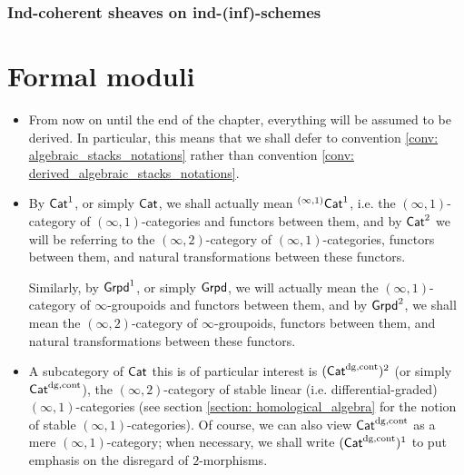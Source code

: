             \subsubsection{Ind-coherent sheaves on ind-(inf)-schemes}
        
    \section{Formal moduli}
        \begin{convention} \label{conv: moduli_everything_is_derived}
            \noindent
            \begin{itemize}
                \item From now on until the end of the chapter, everything will be assumed to be derived. In particular, this means that we shall defer to convention \ref{conv: algebraic_stacks_notations} rather than convention \ref{conv: derived_algebraic_stacks_notations}.
                \item By $\mathsf{Cat}^1$, or simply $\mathsf{Cat}$, we shall actually mean ${}^{(\infty, 1)}\mathsf{Cat}^1$, i.e. the $(\infty, 1)$-category of $(\infty, 1)$-categories and functors between them, and by $\mathsf{Cat}^2$ we will be referring to the $(\infty, 2)$-category of $(\infty, 1)$-categories, functors between them, and natural transformations between these functors. 
                
                Similarly, by $\mathsf{Grpd}^1$, or simply $\mathsf{Grpd}$, we will actually mean the $(\infty, 1)$-category of $\infty$-groupoids and functors between them, and by $\mathsf{Grpd}^2$, we shall mean the $(\infty, 2)$-category of $\infty$-groupoids, functors between them, and natural transformations between these functors.
                \item A subcategory of $\mathsf{Cat}$ this is of particular interest is $(\mathsf{Cat}^{\mathrm{dg}, \mathrm{cont}})^2$ (or simply $\mathsf{Cat}^{\mathrm{dg}, \mathrm{cont}}$), the $(\infty, 2)$-category of stable linear (i.e. differential-graded) $(\infty, 1)$-categories (see section \ref{section: homological_algebra} for the notion of stable $(\infty, 1)$-categories). Of course, we can also view $\mathsf{Cat}^{\mathrm{dg}, \mathrm{cont}}$ as a mere $(\infty, 1)$-category; when necessary, we shall write $(\mathsf{Cat}^{\mathrm{dg}, \mathrm{cont}})^1$ to put emphasis on the disregard of $2$-morphisms.
            \end{itemize} 
        \end{convention}
    
